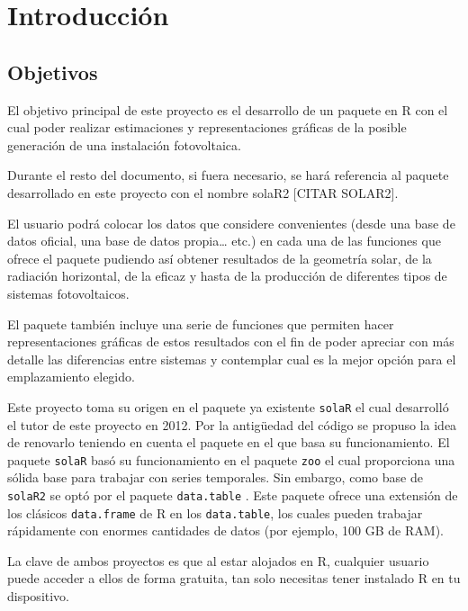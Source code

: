 \chapter{Introducción}
\label{chap:introduccion}

\section{Objetivos}
\label{sec:org2c66929}
\label{sec:objetivos}
El objetivo principal de este proyecto es el desarrollo de un paquete en R \cite{rcoreteam23} con el cual poder realizar estimaciones y representaciones gráficas de la posible generación de una instalación fotovoltaica.

Durante el resto del documento, si fuera necesario, se hará referencia al paquete desarrollado en este proyecto con el nombre solaR2 [CITAR SOLAR2].

El usuario podrá colocar los datos que considere convenientes (desde una base de datos oficial, una base de datos propia\ldots{} etc.) en cada una de las funciones que ofrece el paquete pudiendo así obtener resultados de la geometría solar, de la radiación horizontal, de la eficaz y hasta de la producción de diferentes tipos de sistemas fotovoltaicos.

El paquete también incluye una serie de funciones que permiten hacer representaciones gráficas de estos resultados con el fin de poder apreciar con más detalle las diferencias entre sistemas y contemplar cual es la mejor opción para el emplazamiento elegido.

Este proyecto toma su origen en el paquete ya existente \texttt{solaR} \cite{perpinan12} el cual desarrolló el tutor de este proyecto en 2012. Por la antigüedad del código se propuso la idea de renovarlo teniendo en cuenta el paquete en el que basa su funcionamiento. El paquete \texttt{solaR} basó su funcionamiento en el paquete \texttt{zoo} \cite{zeileis05} el cual proporciona una sólida base para trabajar con series temporales. Sin embargo, como base de \texttt{solaR2} se optó por el paquete \texttt{data.table} \cite{barrett24}. Este paquete ofrece una extensión de los clásicos \texttt{data.frame} de R en los \texttt{data.table}, los cuales pueden trabajar rápidamente con enormes cantidades de datos (por ejemplo, 100 GB de RAM).

La clave de ambos proyectos es que al estar alojados en R, cualquier usuario puede acceder a ellos de forma gratuita, tan solo necesitas tener instalado R en tu dispositivo.

